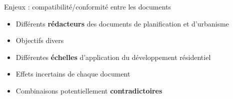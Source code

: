 \documentclass[xcolor=table]{beamer}
\begin{document}
\begin{frame}{Enjeux : compatibilité/conformité entre les documents}
	\begin{itemize}
		\item Différents \textbf{rédacteurs} des documents de planification et d'urbanisme
		\item Objectifs divers 
		\item Différentes \textbf{échelles} d'application du développement résidentiel
		\item Effets incertains de chaque document 
		\item Combinaisons potentiellement \textbf{contradictoires}
	\end{itemize}
\end{frame}
\end{document}
